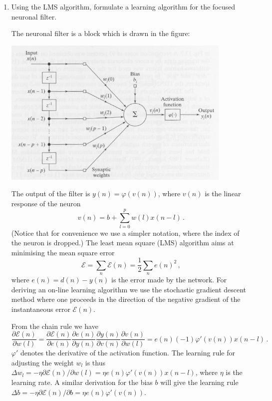 \begin{enumerate}
\begin{solution}
  \end{solution}
  

\item Using the LMS algorithm, formulate a learning algorithm for the
  focused neuronal filter.


  \begin{solution}

    The neuronal filter is a block which is drawn in the figure:

    \begin{center}
      \includegraphics[width=11cm]{l12k3a}
    \end{center}

    The output of the filter is $y(n) =
    \varphi(v(n))$, where $v(n)$ is the linear response of the neuron $$v(n) = b +
    \sum_{l=0}^p w(l) x(n-l) \, .$$ (Notice that for convenience we use
    a simpler notation, where the index of the neuron is dropped.)
    The least mean square (LMS) algorithm aims at minimising the mean
    square error $$\mathcal{E} = \sum_n \mathcal{E}(n) = \frac{1}{2} \sum_n e(n)^2 \, ,$$
    where $e(n) = d(n) - y(n)$ is the error made by the network.  For deriving an
    on-line learning algorithm we  use the stochastic
    gradient descent method where one proceeds in the direction of the negative
    gradient of the instantaneous
    error $\mathcal{E}(n)$.

    From the chain rule we have $$\frac{\partial \mathcal{E}(n)}{\partial w(l)} =
    \frac{\partial \mathcal{E}(n)}{\partial e(n)} \frac{\partial e(n)}{\partial
      y(n)} \frac{\partial y(n)}{\partial v(n)} \frac{\partial
      v(n)}{\partial w(l)} = e(n) (-1) \varphi'(v(n)) x(n-l) \, .$$ 
    $\varphi'$ denotes the derivative of the activation function.
    The
    learning rule for adjusting the weight $w_l$ is thus $\Delta w_l = -\eta \partial \mathcal{E}(n) / \partial
    w(l) = \eta e(n) \varphi'(v(n)) x(n-l)$, where $\eta$ is the learning
    rate.  A similar derivation for the bias $b$ will give the learning
    rule $\Delta b = - \eta \partial \mathcal{E}(n) / \partial b = \eta e(n)
    \varphi'(v(n))$.


\end{solution}
\end{enumerate}
